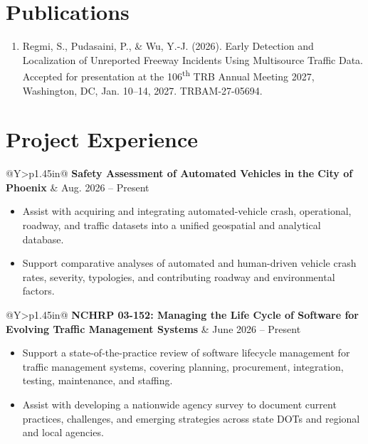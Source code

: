 \documentclass[10pt,letterpaper]{article}
\makeatletter
\newcommand{\projectheading}[2]{%
  \Needspace{7\baselineskip}%
  \begin{tabularx}{\linewidth}{@{}Y>{\raggedleft\arraybackslash}p{1.45in}@{}}
    \textbf{#1} & #2
  \end{tabularx}
}
\newenvironment{cvitems}{%
  \begin{itemize}[
    leftmargin=15pt,
    label=\textbullet,
    labelsep=6pt,
    topsep=2pt,
    itemsep=1.5pt,
    parsep=0pt,
    partopsep=0pt
  ]
}{\end{itemize}}
\newenvironment{cvnumbers}{%
  \begin{enumerate}[
    leftmargin=18pt,
    label=\arabic*.,
    labelsep=5pt,
    topsep=2pt,
    itemsep=2pt,
    parsep=0pt,
    partopsep=0pt
  ]
}{\end{enumerate}}
\newcommand{\projectspace}{\vspace{4pt}}
\makeatother
\begin{document}

\section{Publications}

\begin{cvnumbers}
  \item Regmi, S., Pudasaini, P., \& Wu, Y.-J. (2026). Early Detection and Localization of Unreported Freeway Incidents Using Multisource Traffic Data. Accepted for presentation at the 106\textsuperscript{th} TRB Annual Meeting 2027, Washington, DC, Jan. 10--14, 2027. TRBAM-27-05694.
\end{cvnumbers}

\section{Project Experience}

\projectheading
  {Safety Assessment of Automated Vehicles in the City of Phoenix}
  {Aug. 2026 -- Present}
\begin{cvitems}
  \item Assist with acquiring and integrating automated-vehicle crash, operational, roadway, and traffic datasets into a unified geospatial and analytical database.
  \item Support comparative analyses of automated and human-driven vehicle crash rates, severity, typologies, and contributing roadway and environmental factors.
\end{cvitems}

\projectspace
\projectheading
  {NCHRP 03-152: Managing the Life Cycle of Software for Evolving Traffic Management Systems}
  {June 2026 -- Present}
\begin{cvitems}
  \item Support a state-of-the-practice review of software lifecycle management for traffic management systems, covering planning, procurement, integration, testing, maintenance, and staffing.
  \item Assist with developing a nationwide agency survey to document current practices, challenges, and emerging strategies across state DOTs and regional and local agencies.
\end{cvitems}
\end{document}

